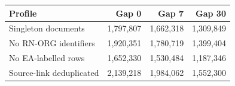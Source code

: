 \begin{tabular}{lrrr}\toprule Profile&Gap 0&Gap 7&Gap 30\\\midrule
Singleton documents&1,797,807&1,662,318&1,309,849\\
No RN-ORG identifiers&1,920,351&1,780,719&1,399,404\\
No EA-labelled rows&1,652,330&1,530,484&1,187,346\\
Source-link deduplicated&2,139,218&1,984,062&1,552,300\\
\bottomrule\end{tabular}